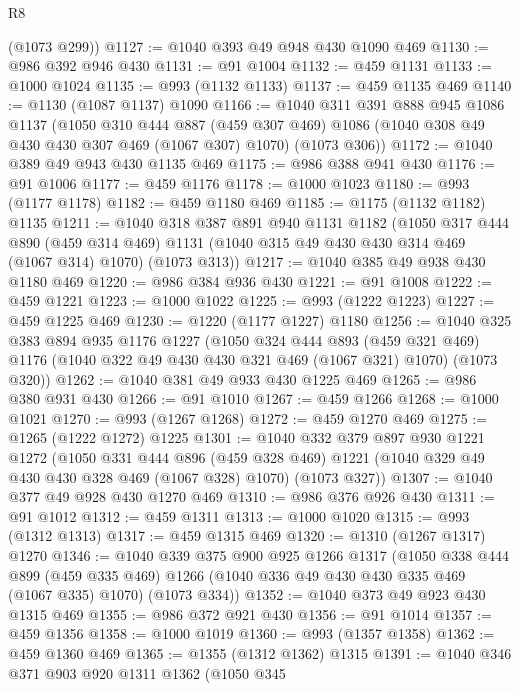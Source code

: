 \begin{lexlean}{R8}
\begin{coremodule}
      (@1073 @299))
@1127 := @1040 @393 @49 @948 @430 @1090 @469
@1130 := @986 @392 @946 @430
@1131 := @91 @1004
@1132 := @459 @1131
@1133 := @1000 @1024
@1135 := @993 (@1132 @1133)
@1137 := @459 @1135 @469
@1140 := @1130 (@1087 @1137) @1090
@1166 := @1040
    @311
    @391
    @888
    @945
    @1086
    @1137
    (@1050
      @310
      @444
      @887
      (@459 @307 @469)
      @1086
      (@1040 @308 @49 @430 @430 @307 @469 (@1067 @307) @1070)
      (@1073 @306))
@1172 := @1040 @389 @49 @943 @430 @1135 @469
@1175 := @986 @388 @941 @430
@1176 := @91 @1006
@1177 := @459 @1176
@1178 := @1000 @1023
@1180 := @993 (@1177 @1178)
@1182 := @459 @1180 @469
@1185 := @1175 (@1132 @1182) @1135
@1211 := @1040
    @318
    @387
    @891
    @940
    @1131
    @1182
    (@1050
      @317
      @444
      @890
      (@459 @314 @469)
      @1131
      (@1040 @315 @49 @430 @430 @314 @469 (@1067 @314) @1070)
      (@1073 @313))
@1217 := @1040 @385 @49 @938 @430 @1180 @469
@1220 := @986 @384 @936 @430
@1221 := @91 @1008
@1222 := @459 @1221
@1223 := @1000 @1022
@1225 := @993 (@1222 @1223)
@1227 := @459 @1225 @469
@1230 := @1220 (@1177 @1227) @1180
@1256 := @1040
    @325
    @383
    @894
    @935
    @1176
    @1227
    (@1050
      @324
      @444
      @893
      (@459 @321 @469)
      @1176
      (@1040 @322 @49 @430 @430 @321 @469 (@1067 @321) @1070)
      (@1073 @320))
@1262 := @1040 @381 @49 @933 @430 @1225 @469
@1265 := @986 @380 @931 @430
@1266 := @91 @1010
@1267 := @459 @1266
@1268 := @1000 @1021
@1270 := @993 (@1267 @1268)
@1272 := @459 @1270 @469
@1275 := @1265 (@1222 @1272) @1225
@1301 := @1040
    @332
    @379
    @897
    @930
    @1221
    @1272
    (@1050
      @331
      @444
      @896
      (@459 @328 @469)
      @1221
      (@1040 @329 @49 @430 @430 @328 @469 (@1067 @328) @1070)
      (@1073 @327))
@1307 := @1040 @377 @49 @928 @430 @1270 @469
@1310 := @986 @376 @926 @430
@1311 := @91 @1012
@1312 := @459 @1311
@1313 := @1000 @1020
@1315 := @993 (@1312 @1313)
@1317 := @459 @1315 @469
@1320 := @1310 (@1267 @1317) @1270
@1346 := @1040
    @339
    @375
    @900
    @925
    @1266
    @1317
    (@1050
      @338
      @444
      @899
      (@459 @335 @469)
      @1266
      (@1040 @336 @49 @430 @430 @335 @469 (@1067 @335) @1070)
      (@1073 @334))
@1352 := @1040 @373 @49 @923 @430 @1315 @469
@1355 := @986 @372 @921 @430
@1356 := @91 @1014
@1357 := @459 @1356
@1358 := @1000 @1019
@1360 := @993 (@1357 @1358)
@1362 := @459 @1360 @469
@1365 := @1355 (@1312 @1362) @1315
@1391 := @1040
    @346
    @371
    @903
    @920
    @1311
    @1362
    (@1050
      @345

\end{coremodule}
\end{lexlean}
